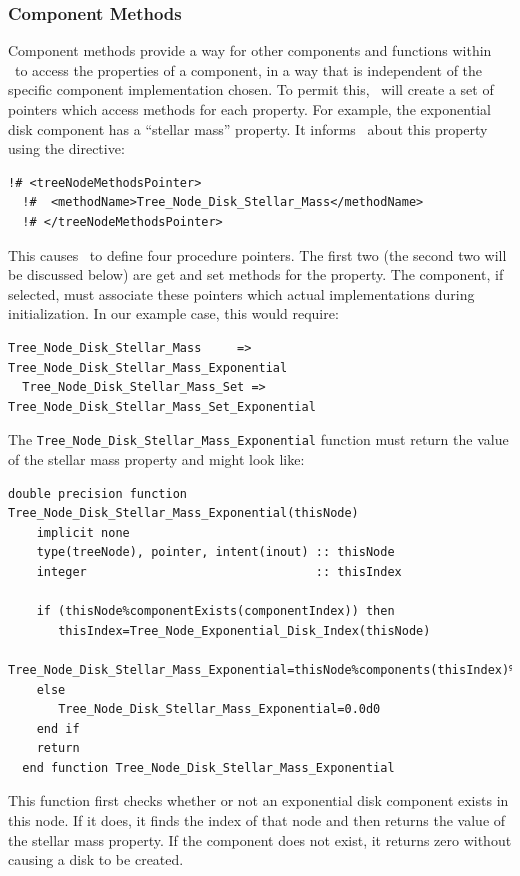 \subsubsection{Component Methods}

Component methods provide a way for other components and functions within \glc\ to access the properties of a component, in a way that is independent of the specific component implementation chosen. To permit this, \glc\ will create a set of pointers which access methods for each property. For example, the exponential disk component has a ``stellar mass'' property. It informs \glc\ about this property using the directive:
\begin{lstlisting}[escapechar=@,breaklines,prebreak=\&,postbreak=\&]
  !# <treeNodeMethodsPointer>
  !#  <methodName>Tree_Node_Disk_Stellar_Mass</methodName>
  !# </treeNodeMethodsPointer>
\end{lstlisting}
This causes \glc\ to define four procedure pointers. The first two (the second two will be discussed below) are get and set methods for the property. The component, if selected, must associate these pointers which actual implementations during initialization. In our example case, this would require:
\begin{lstlisting}[escapechar=@,breaklines,prebreak=\&,postbreak=\&]
  Tree_Node_Disk_Stellar_Mass     => Tree_Node_Disk_Stellar_Mass_Exponential
  Tree_Node_Disk_Stellar_Mass_Set => Tree_Node_Disk_Stellar_Mass_Set_Exponential
\end{lstlisting}
The {\tt Tree\_Node\_Disk\_Stellar\_Mass\_Exponential} function must return the value of the stellar mass property and might look like:
\begin{lstlisting}[escapechar=@,breaklines,prebreak=\&,postbreak=\&]
  double precision function Tree_Node_Disk_Stellar_Mass_Exponential(thisNode)
    implicit none
    type(treeNode), pointer, intent(inout) :: thisNode
    integer                                :: thisIndex

    if (thisNode%componentExists(componentIndex)) then
       thisIndex=Tree_Node_Exponential_Disk_Index(thisNode)
       Tree_Node_Disk_Stellar_Mass_Exponential=thisNode%components(thisIndex)%properties(stellarMassIndex,propertyValue)
    else
       Tree_Node_Disk_Stellar_Mass_Exponential=0.0d0
    end if
    return
  end function Tree_Node_Disk_Stellar_Mass_Exponential
\end{lstlisting}
This function first checks whether or not an exponential disk component exists in this node. If it does, it finds the index of that node and then returns the value of the stellar mass property. If the component does not exist, it returns zero without causing a disk to be created.

